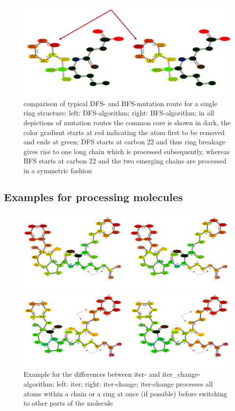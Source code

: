 \begin{figure}
\includegraphics[scale=0.4]{simple_ring_exampledfs.png}

\caption{comparison of typical DFS- and BFS-mutation route for a single ring structure; left: DFS-algorithm; right: BFS-algorithm; in all depictions of mutation routes the common core is shown in dark, the color gradient starts at red indicating the atom first to be removed and ends at green; DFS
starts at carbon 22 and thus ring breakage gives rise to one long
chain which is processed subsequently, whereas BFS starts at carbon
22 and the two emerging chains are processed in a symmetric fashion
}

\end{figure}


\subsection{Examples for processing molecules}

\begin{figure}
\includegraphics[scale=0.4]{iter_iter_change_1a5g_1}

\includegraphics[scale=0.4]{iter_iter_change_1a5g_2}\caption{Example for the differences between iter- and iter\_change-algorithm;
left: iter; right: iter-change; iter-change processes all atoms within
a chain or a ring at once (if possible) before switching to other
parts of the molecule}
\end{figure}

